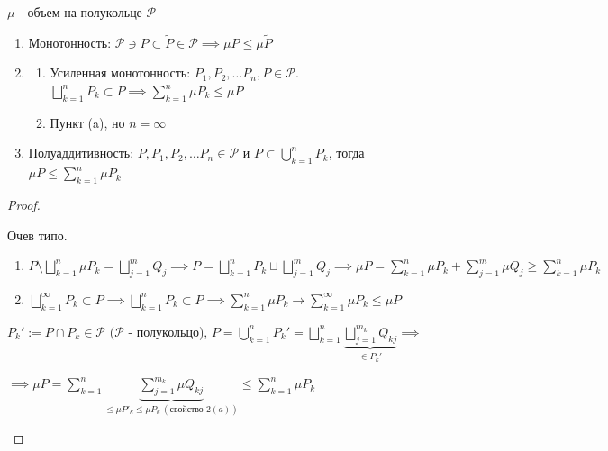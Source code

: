 \begin{theorem}
    $\mu$ - объем на полукольце $\mathcal{P}$

    \begin{enumerate}
        \item Монотонность: $\mathcal{P} \ni P \subset \tilde{P} \in \mathcal{P} \implies \mu P \leq \mu \tilde{P}$
        \item {
            \begin{enumerate}
                \item Усиленная монотонность: $P_1, P_2, \dots P_n, P \in \mathcal{P}$. $\bigsqcup_{k=1}^n P_k \subset P \implies \sum_{k=1}^n \mu P_k \leq \mu P$
                \item Пункт (a), но $n = \infty$
            \end{enumerate}
        }
        \item Полуаддитивность: $P, P_1, P_2, \dots P_n \in \mathcal{P}$ и $P \subset \bigcup_{k=1}^{n}P_k$, тогда $\mu P \leq \sum_{k=1}^{n} \mu P_k$ 
    \end{enumerate}
\end{theorem}

\begin{proof}
    \begin{enumerate}
        \item Очев типо.
        \item {
        \begin{enumerate}
            \item $P \setminus \bigsqcup_{k=1}^{n} \mu P_k =  \bigsqcup_{j=1}^{m} Q_j \implies P = \bigsqcup_{k=1}^{n} P_k \sqcup \bigsqcup_{j=1}^m Q_j \implies \mu P = \sum_{k=1}^{n} \mu P_k + \sum_{j=1}^{m} \mu Q_j \geq \sum_{k=1}^{n} \mu P_k $
            \item $\bigsqcup_{k=1}^{\infty} P_k \subset P \implies \bigsqcup_{k=1}^n P_k \subset P \implies \sum_{k=1}^{n} \mu P_k \rightarrow \sum_{k=1}^{\infty} \mu P_k \leq \mu P$
        \end{enumerate}
        \item {
            $P_k' := P \cap P_k \in \mathcal{P}$ ($\mathcal{P}$ - полукольцо), \;\; $P = \bigcup_{k=1}^{n} P_k' = \bigsqcup_{k=1}^{n} \underbrace{\bigsqcup_{j=1}^{m_k} Q_{kj}}_{\in P_k'} \implies$
            
            $\implies \mu P = \sum_{k=1}^n \underbrace{\sum_{j=1}^{m_k} \mu Q_{kj}}_{\leq \mu P'_k \leq \mu P_k \ (\text{свойство } 2(a))} \leq \sum_{k=1}^n \mu P_k$
        }
        }
    \end{enumerate}
\end{proof}

